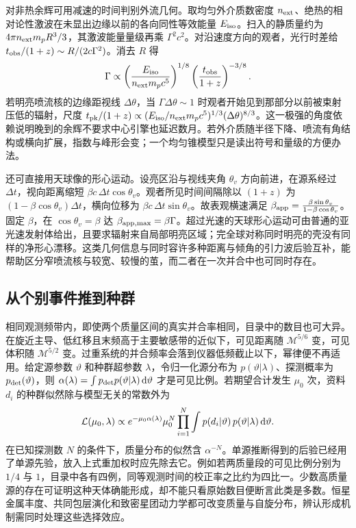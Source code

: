 对非热余辉可用减速的时间判别外流几何。取均匀外介质数密度 $n_{\rm ext}$、绝热的相对论性激波在未显出边缘以前的各向同性等效能量 $E_{\rm iso}$。扫入的静质量约为 $4\pi n_{\rm ext}m_p R^3/3$，其激波能量量级再乘 $\Gamma^2 c^2$。对沿速度方向的观者，光行时差给 $t_{\rm obs}/(1+z)\sim R/(2c\Gamma^2)$。消去 $R$ 得
\[
 \Gamma\propto\left(\frac{E_{\rm iso}}{n_{\rm ext}m_pc^5}\right)^{1/8}
                 \left(\frac{t_{\rm obs}}{1+z}\right)^{-3/8}.
\]
若明亮喷流核的边缘距视线 $\Delta\theta$，当 $\Gamma\Delta\theta\sim1$ 时观者开始见到那部分以前被束射压低的辐射，尺度 $t_{\rm pk}/(1+z)\propto(E_{\rm iso}/n_{\rm ext}m_pc^5)^{1/3}(\Delta\theta)^{8/3}$。这一极强的角度依赖说明晚到的余辉不要求中心引擎也延迟数月。若外介质随半径下降、喷流有角结构或横向扩展，指数与峰形会变；一个均匀锥模型只是读出符号和量级的方便办法。

还可直接用天球像的形心运动。设亮区沿与视线夹角 $\theta_v$ 方向前进，在源系经过 $\Delta t$，视向距离缩短 $\beta c\,\Delta t\cos\theta_v$。观者所见时间间隔除以 $(1+z)$ 为 $(1-\beta\cos\theta_v)\Delta t$，横向位移为 $\beta c\,\Delta t\sin\theta_v$。故表观横速满足 $\beta_{\rm app}=\frac{\beta\sin\theta_v}{1-\beta\cos\theta_v}$。固定 $\beta$，在 $\cos\theta_v=\beta$ 达 $\beta_{\rm app,max}=\beta\Gamma$。超过光速的天球形心运动可由普通的亚光速发射体给出，且要求辐射来自局部明亮区域；完全球对称同时明亮的壳没有同样的净形心漂移。这类几何信息与同时容许多种距离与倾角的引力波后验互补，能帮助区分窄喷流核与较宽、较慢的茧，而二者在一次并合中也可同时存在。

\subsection{从个别事件推到种群}

相同观测频带内，即使两个质量区间的真实并合率相同，目录中的数目也可大异。在旋近主导、低红移且末频高于主要敏感带的近似下，可见距离随 $\mathcal M^{5/6}$ 变，可见体积随 $\mathcal M^{5/2}$ 变。过重系统的并合频率会落到仪器低频截止以下，幂律便不再适用。给定源参数 $\vartheta$ 和种群超参数 $\lambda$，令归一化源分布为 $p(\vartheta|\lambda)$、探测概率为 $p_{\rm det}(\vartheta)$，则 $\alpha(\lambda)=\int p_{\rm det}p(\vartheta|\lambda)\,\dd\vartheta$ 才是可见比例。若期望合计发生 $\mu_0$ 次，资料 $d_i$ 的种群似然除与模型无关的常数外为
\[
 {\cal L}(\mu_0,\lambda)\propto e^{-\mu_0\alpha(\lambda)}\mu_0^{N}
         \prod_{i=1}^{N}\int p(d_i|\vartheta)\,p(\vartheta|\lambda)\,\dd\vartheta .
\]
在已知探测数 $N$ 的条件下，质量分布的似然含 $\alpha^{-N}$。单源推断得到的后验已经用了单源先验，放入上式重加权时应先除去它。例如若两质量段的可见比例分别为 $1/4$ 与 $1$，目录中各有四例，同等观测时间的校正率之比约为四比一。少数高质量源的存在可证明这种天体确能形成，却不能只看原始数目便断言此类是多数。恒星金属丰度、共同包层演化和致密星团动力学都可改变质量与自旋分布，辨认形成机制需同时处理这些选择效应。



